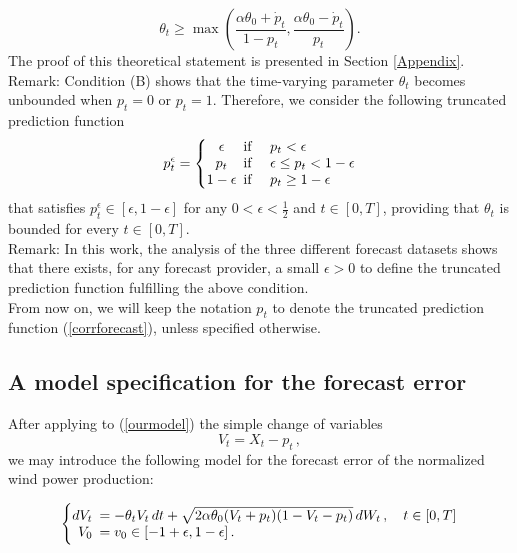 \documentclass[11pt]{article}
\theoremstyle{definition}
\begin{document}
\begin{equation}\label{Assumption:3}
\theta_t\geq \max\left(\frac{\alpha\theta_0+\dot p_t}{1-p_t},\frac{\alpha\theta_0-\dot p_t}{p_t}\right)\tag{B}. 
\end{equation} \label{condB}
The proof of this theoretical statement is presented in Section \ref{Appendix}. \\

Remark: Condition (B) shows that the time-varying parameter $\theta_t$ becomes unbounded when $p_t = 0$ or $p_t = 1$. Therefore, we consider the following truncated prediction function
\begin{equation}
  p_t^{\epsilon} = \left\{
  \begin{array}{@{}cl@{}}
    \epsilon \!\!\!&\text{if \quad} p_t  < \epsilon  \\
    p_t  \!\!\!&\text{if \quad}  \epsilon \leq p_t < 1 - \epsilon \\
    1 - \epsilon  \!\!\!&\text{if \quad}  p_t \geq 1 - \epsilon
 \end{array}\right.  \label{corrforecast}
\end{equation}
that satisfies $p_t^{\epsilon} \in [\epsilon, 1 - \epsilon]$ for any $0 < \epsilon < \frac{1}{2}$ and $t \in [0,T]$, providing that $\theta_t$ is bounded for every $t \in [0,T]$. \\

Remark: In this work, the analysis of the three different forecast datasets shows that there exists, for any forecast provider, a small $\epsilon >0$ to define the truncated prediction function fulfilling the above condition. \\

From now on, we will keep the notation $p_t$ to denote the truncated prediction function (\ref{corrforecast}), unless specified otherwise. 

\subsection{A model specification for the forecast error}
 After applying to (\ref{ourmodel}) the simple change of variables $$V_t = X_t - p_t \,,$$ we may introduce the following model for the forecast error of the normalized wind power production: 

\begin{equation}
  \left\{
  \begin{array}{@{}rl@{}}
    dV_t \!\!\!&=  - \theta_t V_t  \, dt + \sqrt{2 \alpha \theta_0 (V_t +p_t ) (1-V_t-p_t)} \, dW_t\,, \quad t \in [0,T]  \\
   V_0  \!\!\!&=  v_0\in [-1 + \epsilon,1 - \epsilon] \,.
 \end{array}\right.  \label{VtSDE}
\end{equation}
\end{document}
